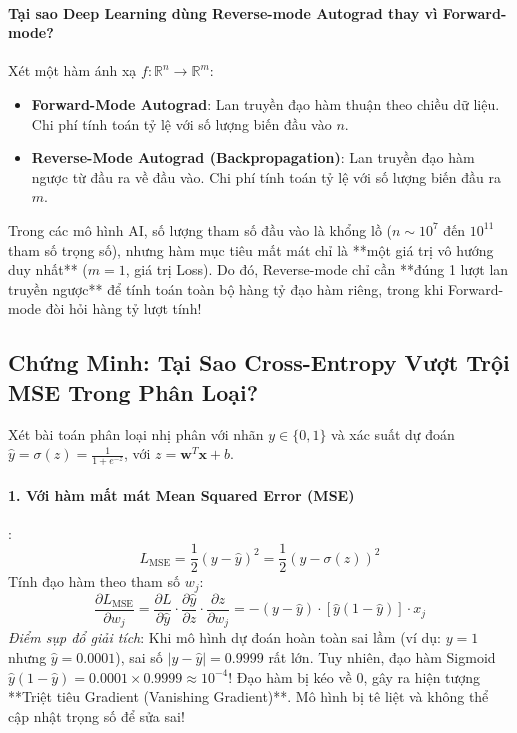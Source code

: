 \paragraph{Tại sao Deep Learning dùng Reverse-mode Autograd thay vì Forward-mode?}
Xét một hàm ánh xạ $f: \mathbb{R}^n \to \mathbb{R}^m$:
\begin{itemize}
  \item \textbf{Forward-Mode Autograd}: Lan truyền đạo hàm thuận theo chiều dữ liệu. Chi phí tính toán tỷ lệ với số lượng biến đầu vào $n$.
  \item \textbf{Reverse-Mode Autograd (Backpropagation)}: Lan truyền đạo hàm ngược từ đầu ra về đầu vào. Chi phí tính toán tỷ lệ với số lượng biến đầu ra $m$.
\end{itemize}
Trong các mô hình AI, số lượng tham số đầu vào là khổng lồ ($n \sim 10^7$ đến $10^{11}$ tham số trọng số), nhưng hàm mục tiêu mất mát chỉ là **một giá trị vô hướng duy nhất** ($m = 1$, giá trị Loss). Do đó, Reverse-mode chỉ cần **đúng 1 lượt lan truyền ngược** để tính toán toàn bộ hàng tỷ đạo hàm riêng, trong khi Forward-mode đòi hỏi hàng tỷ lượt tính!

\subsection{Chứng Minh: Tại Sao Cross-Entropy Vượt Trội MSE Trong Phân Loại?}
Xét bài toán phân loại nhị phân với nhãn $y \in \{0, 1\}$ và xác suất dự đoán $\hat{y} = \sigma(z) = \frac{1}{1 + e^{-z}}$, với $z = \mathbf{w}^T \mathbf{x} + b$.

\paragraph{1. Với hàm mất mát Mean Squared Error (MSE)}:
\begin{equation}
L_{\text{MSE}} = \frac{1}{2}(y - \hat{y})^2 = \frac{1}{2}(y - \sigma(z))^2
\end{equation}
Tính đạo hàm theo tham số $w_j$:
\begin{equation}
\frac{\partial L_{\text{MSE}}}{\partial w_j} = \frac{\partial L}{\partial \hat{y}} \cdot \frac{\partial \hat{y}}{\partial z} \cdot \frac{\partial z}{\partial w_j} = -(y - \hat{y}) \cdot [\hat{y}(1 - \hat{y})] \cdot x_j
\end{equation}
\textit{Điểm sụp đổ giải tích}: Khi mô hình dự đoán hoàn toàn sai lầm (ví dụ: $y = 1$ nhưng $\hat{y} = 0.0001$), sai số $|y - \hat{y}| = 0.9999$ rất lớn. Tuy nhiên, đạo hàm Sigmoid $\hat{y}(1 - \hat{y}) = 0.0001 \times 0.9999 \approx 10^{-4}$! Đạo hàm bị kéo về $0$, gây ra hiện tượng **Triệt tiêu Gradient (Vanishing Gradient)**. Mô hình bị tê liệt và không thể cập nhật trọng số để sửa sai!


